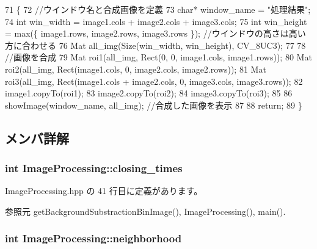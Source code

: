 \begin{DoxyCode}
71 \{
72     \textcolor{comment}{//ウインドウ名と合成画像を定義}
73     \textcolor{keywordtype}{char}* window\_name = \textcolor{stringliteral}{"処理結果"};
74     \textcolor{keywordtype}{int} win\_width = image1.cols + image2.cols + image3.cols;
75     \textcolor{keywordtype}{int} win\_height = max(\{ image1.rows, image2.rows, image3.rows \}); \textcolor{comment}{//ウインドウの高さは高い方に合わせる}
76     Mat all\_img(Size(win\_width, win\_height), CV\_8UC3);
77 
78     \textcolor{comment}{//画像を合成}
79     Mat roi1(all\_img, Rect(0, 0, image1.cols, image1.rows));
80     Mat roi2(all\_img, Rect(image1.cols, 0, image2.cols, image2.rows));
81     Mat roi3(all\_img, Rect(image1.cols + image2.cols, 0, image3.cols, image3.rows));
82     image1.copyTo(roi1);
83     image2.copyTo(roi2);
84     image3.copyTo(roi3);
85 
86     showImage(window\_name, all\_img); \textcolor{comment}{//合成した画像を表示}
87 
88     \textcolor{keywordflow}{return};
89 \}
\end{DoxyCode}


\subsection{メンバ詳解}
\subsubsection[{closing\-\_\-times}]{\setlength{\rightskip}{0pt plus 5cm}int Image\-Processing\-::closing\-\_\-times}\label{class_image_processing_ab2722ccf525edb1d42a45b7f6f530051}


 Image\-Processing.\-hpp の 41 行目に定義があります。



参照元 get\-Background\-Substraction\-Bin\-Image(), Image\-Processing(), main().

\subsubsection[{neighborhood}]{\setlength{\rightskip}{0pt plus 5cm}int Image\-Processing\-::neighborhood}\label{class_image_processing_a4047a0099a07190f555c5c99d311ee42}


